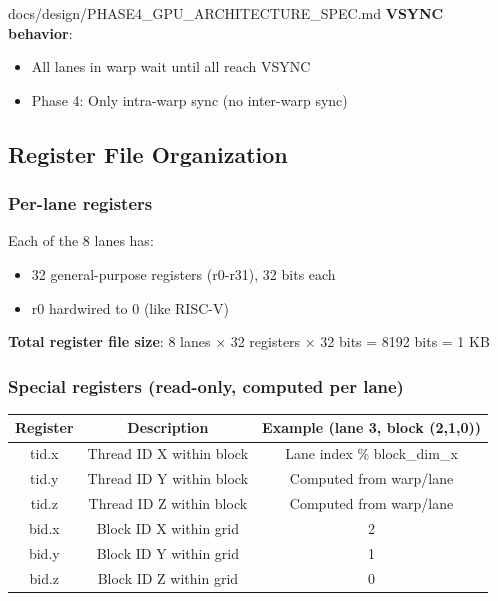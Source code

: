 \begin{relocated}{docs/design/PHASE4_GPU_ARCHITECTURE_SPEC.md}
\textbf{VSYNC behavior}:

\begin{itemize}
\tightlist
\item
  All lanes in warp wait until all reach VSYNC
\item
  Phase 4: Only intra-warp sync (no inter-warp sync)
\end{itemize}

\subsection{Register File Organization}\label{ds:ch:phase4-gpu-architecture:register-file-organization}

\subsubsection{Per-lane registers}\label{ds:ch:phase4-gpu-architecture:per-lane-registers}

Each of the 8 lanes has:

\begin{itemize}
\tightlist
\item
  32 general-purpose registers (r0-r31), 32 bits each
\item
  r0 hardwired to 0 (like RISC-V)
\end{itemize}

\textbf{Total register file size}: 8 lanes × 32 registers × 32 bits =
8192 bits = 1 KB

\subsubsection{Special registers (read-only, computed per lane)}\label{ds:ch:phase4-gpu-architecture:special-registers-read-only-computed-per-lane}

{
\begin{longtable}[]{@{}ccc@{}}
\toprule\noalign{}
Register & Description & Example (lane 3, block (2,1,0)) \\
\midrule\noalign{}
\endhead
\bottomrule\noalign{}
\endlastfoot
tid.x & Thread ID X within block & Lane index \%
block\_\allowbreak{}dim\_\allowbreak{}x \\
tid.y & Thread ID Y within block & Computed from warp/lane \\
tid.z & Thread ID Z within block & Computed from warp/lane \\
bid.x & Block ID X within grid & 2 \\
bid.y & Block ID Y within grid & 1 \\
bid.z & Block ID Z within grid & 0 \\
\end{longtable}
}


\end{relocated}
